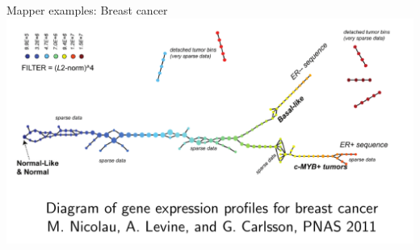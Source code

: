 \documentclass[usenames,dvipsnames,aspectratio=1610]{beamer}
\begin{document}
 \begin{frame}{Mapper examples: Breast cancer}
   \centering
   \includegraphics[scale=0.4]{mapper_cancer.png}
 \end{frame}
\end{document}

